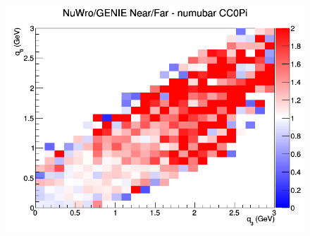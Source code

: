 \documentclass[12pt]{article}
\begin{document}
\begin{figure}[h]
\endminipage
{}
\includegraphics[width=\linewidth]{eff_q0_q3/LAr/ratios/CC0Pi_NuWro_GENIE_numubar_NF_q3_q0.png}
\endminipage
\newline
\end{figure}
\clearpage
\end{document}
